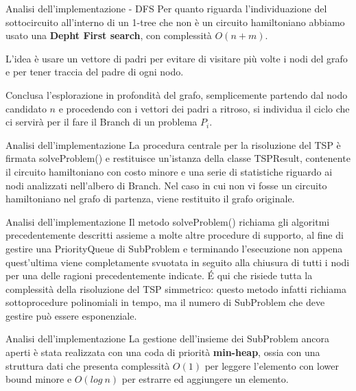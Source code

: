 \documentclass[10pt]{beamer}
\begin{document}
\begin{frame}{Analisi dell'implementazione - DFS}
    Per quanto riguarda l'individuazione del sottocircuito all'interno di un 1-tree che non è un circuito hamiltoniano abbiamo usato una \textbf{Depht First search}, con complessità $O(n+m)$.
    
    L'idea è usare un vettore di padri per evitare di visitare più volte i nodi del grafo e per tener traccia del padre di ogni nodo. 
    
    Conclusa l'esplorazione in profondità del grafo, semplicemente partendo dal nodo candidato $n$ e procedendo con i vettori dei padri a ritroso, si individua il ciclo che ci servirà per il fare il Branch di un problema $P_i$.
\end{frame}

\begin{frame}{Analisi dell'implementazione}
    La procedura centrale per la risoluzione del TSP è firmata {\selectfont solveProblem()} e restituisce un'istanza della classe {\selectfont TSPResult}, contenente il circuito hamiltoniano con costo minore e una serie di statistiche riguardo ai nodi analizzati nell'albero di Branch.
    \newline
    \newline
    Nel caso in cui non vi fosse un circuito hamiltoniano nel grafo di partenza, viene restituito il grafo originale.
\end{frame}

\begin{frame}{Analisi dell'implementazione}
    Il metodo {\selectfont solveProblem()} richiama gli algoritmi precedentemente descritti assieme a molte altre procedure di supporto, al fine di gestire una {\selectfont PriorityQueue} di {\selectfont SubProblem} e terminando l'esecuzione non appena quest'ultima viene completamente svuotata in seguito alla chiusura di tutti i nodi per una delle ragioni precedentemente indicate. 
    \newline
    \newline
    \'E qui che risiede tutta la complessità della risoluzione del TSP simmetrico: questo metodo infatti richiama sottoprocedure polinomiali in tempo, ma il numero di {\selectfont SubProblem} che deve gestire può essere esponenziale.
\end{frame}

\begin{frame}{Analisi dell'implementazione}
    La gestione dell'insieme dei {\selectfont SubProblem} ancora aperti è stata realizzata con una coda di priorità \textbf{min-heap}, ossia con una struttura dati che presenta complessità $O(1)$ per leggere l'elemento con lower bound minore e $O(log\:n)$ per estrarre ed aggiungere un elemento.
\end{frame}
\end{document}
